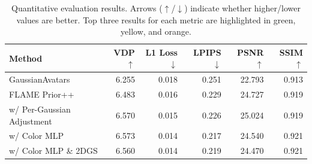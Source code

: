 \begin{table}[htbp]
\centering
\begin{tabular}{lrrrrr}
\toprule
Method & VDP \ensuremath{\uparrow} & L1 Loss \ensuremath{\downarrow} & LPIPS \ensuremath{\downarrow} & PSNR \ensuremath{\uparrow} & SSIM \ensuremath{\uparrow} \\
\midrule
GaussianAvatars & 6.255 & 0.018 & 0.251 & 22.793 & 0.913 \\
FLAME Prior++ & 6.483 & 0.016 & 0.229 & \cellcolor{yellow!25}24.727 & 0.919 \\
w/ Per-Gaussian Adjustment & \cellcolor{yellow!25}6.570 & \cellcolor{orange!25}0.015 & \cellcolor{orange!25}0.226 & \cellcolor{green!25}25.024 & \cellcolor{orange!25}0.919 \\
w/ Color MLP & \cellcolor{green!25}6.573 & \cellcolor{green!25}0.014 & \cellcolor{green!25}0.217 & \cellcolor{orange!25}24.540 & \cellcolor{yellow!25}0.921 \\
w/ Color MLP \& 2DGS & \cellcolor{orange!25}6.560 & \cellcolor{yellow!25}0.014 & \cellcolor{yellow!25}0.219 & 24.470 & \cellcolor{green!25}0.921 \\
\bottomrule
\end{tabular}
\caption{Quantitative evaluation results. Arrows (\ensuremath{\uparrow}/\ensuremath{\downarrow}) indicate whether higher/lower values are better. 
Top three results for each metric are highlighted in \textcolor{green!75}{green}, 
\textcolor{yellow!75}{yellow}, and \textcolor{orange!75}{orange}.}
\label{tab:quantitative_results}
\end{table}